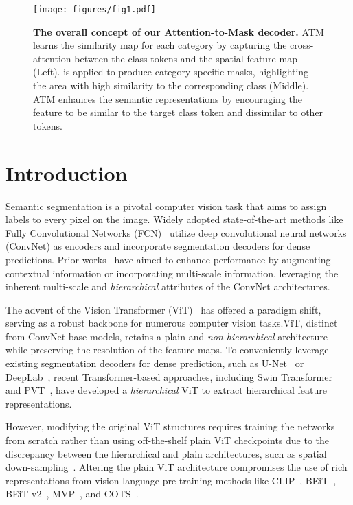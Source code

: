 \begin{figure*}[t]
    \centering
    \texttt{[image: figures/fig1.pdf]}
    \caption{\textbf{The overall concept of 
    our Attention-to-Mask decoder.} 
    ATM learns the similarity map for each category by capturing the cross-attention between the class tokens and the spatial feature map (Left).  is applied to produce category-specific masks, highlighting the area with high similarity to the corresponding class (Middle). ATM enhances the semantic representations by encouraging the feature to be similar to the target class token and dissimilar to other tokens. }
    \label{fig:attn_vs_mask}
\end{figure*}


\section{Introduction}

Semantic segmentation is a pivotal computer vision task that aims to assign labels to every pixel on the image. 
Widely adopted state-of-the-art methods like Fully Convolutional Networks (FCN)~\cite{fcn} utilize deep convolutional neural networks (ConvNet) as encoders and incorporate segmentation decoders for dense predictions.
Prior works~\cite{wang2020deep, ocrnet, dv3} have aimed to enhance performance by augmenting contextual information or incorporating multi-scale information, leveraging the inherent multi-scale and \textit{hierarchical} attributes of the ConvNet architectures.

The advent of the Vision Transformer (ViT)~\cite{vit} has offered a paradigm shift, serving as a robust backbone for numerous computer vision tasks.ViT, distinct from ConvNet base models, retains a plain and \textit{non-hierarchical} architecture while preserving the resolution of the feature maps. To conveniently leverage existing segmentation decoders for dense prediction, such as U-Net~\cite{ronneberger2015u} or DeepLab~\cite{dv3}, recent Transformer-based approaches, including Swin Transformer~\cite{liu2021swin} and PVT~\cite{pvt}, have developed a \textit{hierarchical} ViT to extract hierarchical feature representations.

However, modifying the original ViT structures requires training the networks from scratch rather than using off-the-shelf plain ViT checkpoints due to the discrepancy between the hierarchical and plain architectures, such as spatial down-sampling~\cite{xu2022rethinking}.
Altering the plain ViT architecture compromises the use of rich representations from vision-language pre-training methods like CLIP~\cite{radford2021learning}, BEiT~\cite{beit}, BEiT-v2~\cite{beitv2}, MVP~\cite{wei2022mvp}, and COTS~\cite{lu2022cots}.


